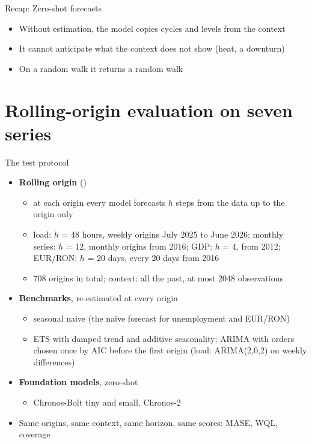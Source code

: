 \begin{frame}{Recap: Zero-shot forecasts}
\itemsize{\small}
\begin{itemize}
    \item Without estimation, the model copies cycles and levels from the context
    \item It cannot anticipate what the context does not show (heat, a downturn)
    \item On a random walk it returns a random walk
\end{itemize}
\end{frame}


\section{Rolling-origin evaluation on seven series}

\begin{frame}{The test protocol}
\itemsize{\footnotesize}
\begin{itemize}
    \item \textbf{Rolling origin} ()
    \begin{itemize}
        \item at each origin every model forecasts $h$ steps from the data up to the origin only
        \item load: $h$ = 48 hours, weekly origins July 2025 to June 2026; monthly series: $h$ = 12, monthly origins from 2016; GDP: $h$ = 4, from 2012; EUR/RON: $h$ = 20 days, every 20 days from 2016
        \item 708 origins in total; context: all the past, at most 2048 observations
    \end{itemize}
    \item \textbf{Benchmarks}, re-estimated at every origin
    \begin{itemize}
        \item seasonal naive (the naive forecast for unemployment and EUR/RON)
        \item ETS with damped trend and additive seasonality; ARIMA with orders chosen once by AIC before the first origin (load: ARIMA(2,0,2) on weekly differences)
    \end{itemize}
    \item \textbf{Foundation models}, zero-shot
    \begin{itemize}
        \item Chronos-Bolt tiny and small, Chronos-2
    \end{itemize}
    \item Same origins, same context, same horizon, same scores: MASE, WQL, coverage
\end{itemize}
\end{frame}

